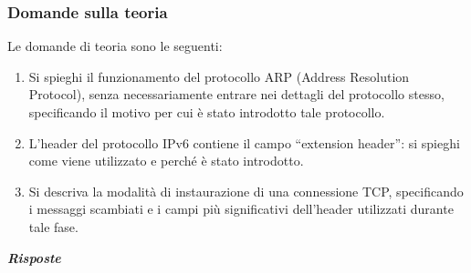 \documentclass[a4paper]{article}
\newcommand{\dquotes}[1]{``#1''}
\begin{document}
	\subsubsection{Domande sulla teoria}
	Le domande di teoria sono le seguenti:
	\begin{enumerate}
		\item Si spieghi il funzionamento del protocollo ARP (Address Resolution Protocol), senza necessariamente entrare nei dettagli del protocollo stesso, specificando il motivo per cui è stato introdotto tale protocollo.
		
		\item L'header del protocollo IPv6 contiene il campo \dquotes{extension header}: si spieghi come viene utilizzato e perché è stato introdotto.
		
		\item Si descriva la modalità di instaurazione di una connessione TCP, specificando i messaggi scambiati e i campi più significativi dell'header utilizzati durante tale fase.
	\end{enumerate}
	\textcolor{Green4}{\textbf{\emph{Risposte}}}
\end{document}
